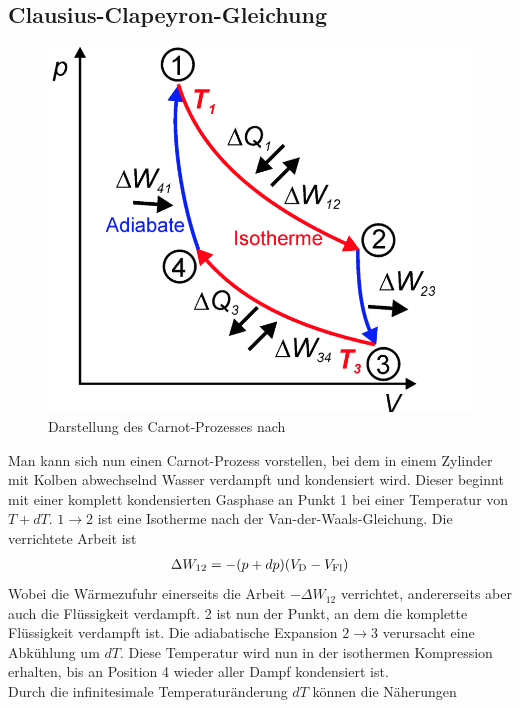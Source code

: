\documentclass[12pt,a4paper,titlepage,headinclude,bibtotoc]{scrartcl}
\begin{document}
\subsection{Clausius-Clapeyron-Gleichung}
\begin{figure}[!h]
\centering
\includegraphics[scale=0.3]{Carnot}
\caption{Darstellung des Carnot-Prozesses nach \protect\footnotemark}
\label{fig:carnot}
\end{figure}
Man kann sich nun einen Carnot-Prozess vorstellen, bei dem in einem Zylinder mit Kolben abwechselnd Wasser verdampft und kondensiert wird.
Dieser beginnt mit einer komplett kondensierten Gasphase an Punkt 1 bei einer Temperatur von $T+dT$.
$1\rightarrow 2$ ist eine Isotherme nach der Van-der-Waals-Gleichung.
Die verrichtete Arbeit ist%
\begin{align*}
\Delta W_{12}=-(p+dp)(V_\text D-V_\text{Fl})
\end{align*}
Wobei die Wärmezufuhr einerseits die Arbeit $-\Delta W_{12}$ verrichtet, andererseits aber auch die Flüssigkeit verdampft.
2 ist nun der Punkt, an dem die komplette Flüssigkeit verdampft ist.
Die adiabatische Expansion $2\rightarrow 3$ verursacht eine Abkühlung um $dT$.
Diese Temperatur wird nun in der isothermen Kompression erhalten, bis an Position 4 wieder aller Dampf kondensiert ist.\\
Durch die infinitesimale Temperaturänderung $dT$ können die Näherungen
\end{document}
